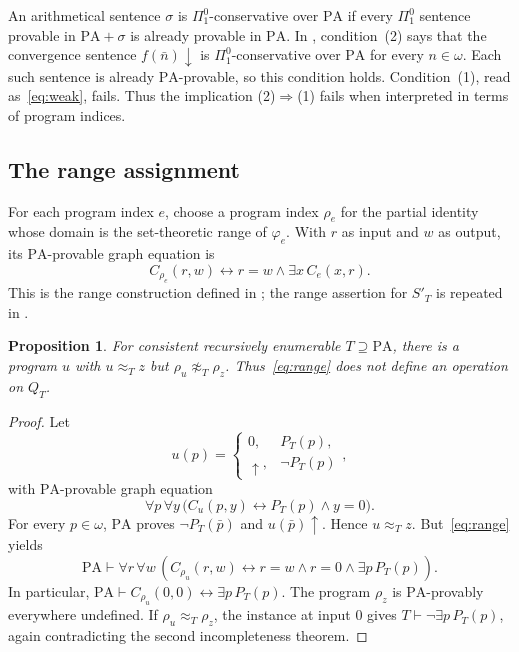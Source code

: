 \documentclass[11pt]{article}
\newtheorem{proposition}[theorem]{Proposition}
\newcommand{\PA}{\mathrm{PA}}
\begin{document}
An arithmetical sentence $\sigma$ is $\Pi^0_1$-conservative over
$\PA$ if every $\Pi^0_1$ sentence provable in $\PA+\sigma$ is
already provable in $\PA$.
In \cite[Theorem~2.3, p.~111]{Montagna}, condition~(2) says that
the convergence sentence $f(\bar n)\downarrow$ is
$\Pi^0_1$-conservative over $\PA$ for every $n\in\omega$.
Each such sentence is already $\PA$-provable, so this condition holds.
Condition~(1), read as~\eqref{eq:weak}, fails.
Thus the implication (2)$\Rightarrow$(1) fails when interpreted in
terms of program indices.

\subsection{The range assignment}

For each program index $e$, choose a program index $\rho_e$ for the partial
identity whose domain is the set-theoretic range of $\varphi_e$. With $r$ as
input and $w$ as output, its $\PA$-provable graph equation is
\begin{equation}\label{eq:range}
 C_{\rho_e}(r,w)\longleftrightarrow
 r=w\land\exists x\,C_e(x,r).
\end{equation}
This is the range construction defined in
\cite[p.~111]{Montagna}; the range assertion for $S'_T$ is repeated in
\cite[p.~646]{DiPaolaMontagna}.

\begin{proposition}\label{prop:range}
For consistent recursively enumerable $T\supseteq\PA$, there is a program
$u$ with $u\approx_Tz$ but $\rho_u\not\approx_T\rho_z$.
Thus~\eqref{eq:range} does not define an operation on $Q_T$.
\end{proposition}

\begin{proof}
Let
\[
 u(p)=
 \begin{cases}
 0,&P_T(p),\\
 \uparrow,&\neg P_T(p)
 \end{cases},
\]
with $\PA$-provable graph equation
\[
 \forall p\,\forall y\,
 \bigl(C_u(p,y)\longleftrightarrow P_T(p)\land y=0\bigr).
\]
For every $p\in\omega$, $\PA$ proves $\neg P_T(\bar p)$ and
$u(\bar p)\uparrow$. Hence $u\approx_Tz$.
But~\eqref{eq:range} yields
\[
 \PA\vdash\forall r\,\forall w\,
 \left(C_{\rho_u}(r,w)\longleftrightarrow
       r=w\land r=0\land\exists p\,P_T(p)\right).
\]
In particular,
$\PA\vdash C_{\rho_u}(0,0)\leftrightarrow\exists p\,P_T(p)$.
The program $\rho_z$ is $\PA$-provably everywhere undefined.
If $\rho_u\approx_T\rho_z$, the instance at input $0$ gives
$T\vdash\neg\exists p\,P_T(p)$, again contradicting the second
incompleteness theorem.
\end{proof}
\end{document}

